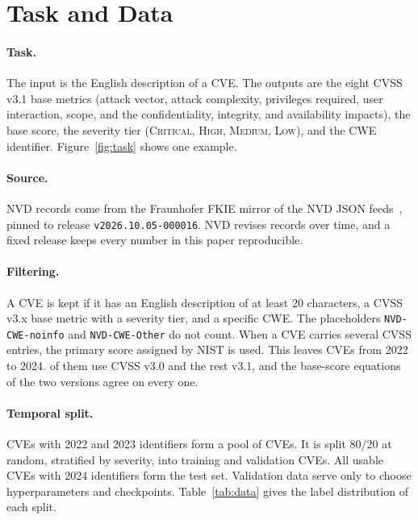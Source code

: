 \section{Task and Data}\label{sec:data}

\paragraph{Task.}
The input is the English description of a CVE.
The outputs are the eight CVSS v3.1 base metrics (attack vector, attack complexity, privileges required, user interaction, scope, and the confidentiality, integrity, and availability impacts), the base score, the severity tier (\textsc{Critical}, \textsc{High}, \textsc{Medium}, \textsc{Low}), and the CWE identifier.
Figure~\ref{fig:task} shows one example.

\paragraph{Source.}
NVD records come from the Fraunhofer FKIE mirror of the NVD JSON feeds~\citep{fkie2026nvdfeeds}, pinned to release \texttt{v2026.10.05-000016}.
NVD revises records over time, and a fixed release keeps every number in this paper reproducible.

\paragraph{Filtering.}
A CVE is kept if it has an English description of at least 20 characters, a CVSS v3.x base metric with a severity tier, and a specific CWE.
The placeholders \texttt{NVD-CWE-noinfo} and \texttt{NVD-CWE-Other} do not count.
When a CVE carries several CVSS entries, the primary score assigned by NIST is used.
This leaves \nAll{} CVEs from 2022 to 2024.
\nVThreeZero{} of them use CVSS v3.0 and the rest v3.1, and the base-score equations of the two versions agree on every one.

\paragraph{Temporal split.}
CVEs with 2022 and 2023 identifiers form a pool of \nTrainVal{} CVEs.
It is split 80/20 at random, stratified by severity, into \nTrain{} training and \nVal{} validation CVEs.
All \nTest{} usable CVEs with 2024 identifiers form the test set.
Validation data serve only to choose hyperparameters and checkpoints.
Table~\ref{tab:data} gives the label distribution of each split.

